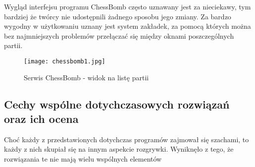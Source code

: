 \documentclass[12pt,leqno]{article}
\begin{document}
Wygląd interfejsu programu ChessBomb często uznawany jest za nieciekawy, tym bardziej że twórcy nie udostępnili żadnego sposobu jego zmiany. Za bardzo wygodny w użytkowaniu uznany jest system zakładek, za pomocą których można bez najmniejszych problemów przełączać się między oknami poszczególnych partii. 
\begin{figure}
\texttt{[image: chessbomb1.jpg]}
\caption{Serwis ChessBomb - widok na listę partii}
\end{figure}

\subsection{Cechy wspólne dotychczasowych rozwiązań oraz ich ocena}
Choć każdy z przedstawionych dotychczas programów zajmował się szachami, to każdy z nich skupiał się na innym aspekcie rozgrywki. Wyniknęło z tego, że rozwiązania te nie mają wielu wspólnych elementów
\end{document}
